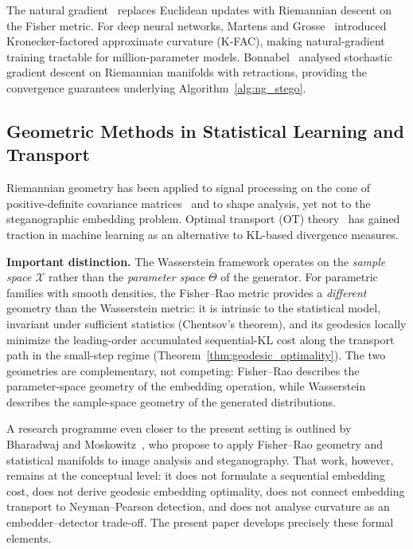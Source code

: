 \documentclass[a4paper,fleqn]{cas-dc}
\begin{document}
The natural gradient~\cite{amari1998natural} replaces Euclidean updates
with Riemannian descent on the Fisher metric.
For deep neural networks, Martens and Grosse~\cite{martens2015optimizing}
introduced Kronecker-factored approximate curvature (K-FAC), making
natural-gradient training tractable for million-parameter models.
Bonnabel~\cite{bonnabel2013stochastic} analysed stochastic gradient descent
on Riemannian manifolds with retractions, providing the convergence
guarantees underlying Algorithm~\ref{alg:ng_stego}.

\subsection{Geometric Methods in Statistical Learning and Transport}

Riemannian geometry has been applied to signal processing on the cone of
positive-definite covariance matrices~\cite{pennec2006riemannian} and to
shape analysis, yet not to the steganographic embedding problem.
Optimal transport (OT) theory~\cite{villani2009optimal,peyre2019computational}
has gained traction in machine learning as an alternative to KL-based
divergence measures.

\textbf{Important distinction.}
The Wasserstein framework operates on the \emph{sample space}
$\mathcal{X}$ rather than the \emph{parameter space} $\Theta$ of the
generator.
For parametric families with smooth densities, the Fisher--Rao metric
provides a \emph{different} geometry than the Wasserstein metric: it is
intrinsic to the statistical model, invariant under sufficient
statistics (Chentsov's theorem), and its geodesics locally minimize the leading-order accumulated sequential-KL cost along the transport path in the small-step regime (Theorem~\ref{thm:geodesic_optimality}).
The two geometries are complementary, not competing: Fisher--Rao
describes the parameter-space geometry of the embedding operation,
while Wasserstein describes the sample-space geometry of the generated
distributions.

A research programme even closer to the present setting is outlined by
Bharadwaj and Moskowitz~\cite{moskowitz2018assuring}, who propose to apply
Fisher--Rao geometry and statistical manifolds to image analysis and
steganography.
That work, however, remains at the conceptual level: it does not formulate a
sequential embedding cost, does not derive geodesic embedding optimality, does
not connect embedding transport to Neyman--Pearson detection, and does not
analyse curvature as an embedder--detector trade-off.
The present paper develops precisely these formal elements.
\end{document}
